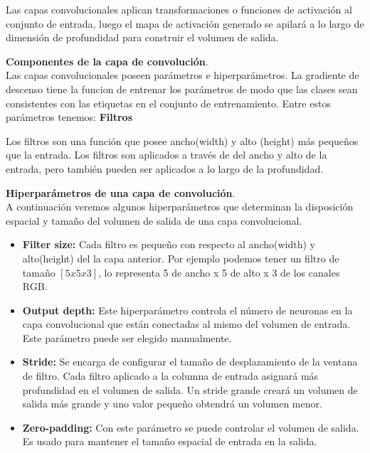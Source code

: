 Las capas convolucionales aplican transformaciones o funciones de activación al conjunto de entrada, luego el mapa de activación generado se apilará a lo largo de dimensión de profundidad para construir el volumen de salida.

\textbf{Componentes de la capa de convolución}.\\	
Las capas convolucionales poseen parámetros e hiperparámetros. La gradiente de descenso tiene la funcion de entrenar los parámetros de modo que las clases sean consistentes con las etiquetas en el conjunto de entrenamiento. Entre estos parámetros tenemos:
\textbf{Filtros}

Los filtros son una función que posee ancho(width) y alto (height) más pequeños que la entrada. Los filtros son aplicados a través de  del ancho y alto de la entrada, pero también pueden ser aplicados a lo largo de la profundidad.

\textbf{Hiperparámetros de una capa de convolución}.\\
A continuación veremos algunos hiperparámetros que determinan la disposición espacial y tamaño del volumen de salida de una capa convolucional.
\begin{itemize}
	\item \textbf{Filter size:} Cada filtro es pequeño con respecto al ancho(width) y alto(height) del la capa anterior. Por ejemplo podemos tener un filtro de tamaño $[5x5x3]$, lo representa 5 de ancho x 5 de alto x 3 de los canales RGB.
	\item \textbf{Output depth:} Este hiperparámetro controla el número de neuronas en la capa convolucional que están conectadas al mismo del volumen de entrada. Este parámetro puede ser elegido manualmente.
	\item \textbf{Stride:} Se encarga de configurar el tamaño de desplazamiento de la ventana de filtro. Cada filtro aplicado a la columna de entrada asignará más profundidad en el volumen de salida. Un stride grande creará un volumen de salida más grande y uno valor pequeño obtendrá un volumen menor.
	\item \textbf{Zero-padding:} Con este parámetro se puede controlar el volumen de salida. Es usado para mantener el tamaño espacial de entrada en la salida. 
\end{itemize}

